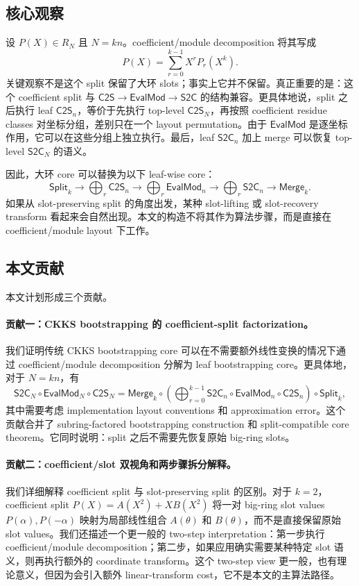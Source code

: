 \documentclass[UTF8,11pt]{article}
\newcommand{\Split}{\mathsf{Split}}
\newcommand{\Merge}{\mathsf{Merge}}
\newcommand{\CtwoS}{\mathsf{C2S}}
\newcommand{\StwoC}{\mathsf{S2C}}
\newcommand{\EvalMod}{\mathsf{EvalMod}}
\theoremstyle{definition}
\theoremstyle{plain}
\begin{document}
\subsection{核心观察}
设 $P(X)\in R_N$ 且 $N=kn$。coefficient/module decomposition 将其写成
\[
P(X)=\sum_{r=0}^{k-1}X^rP_r(X^k).
\]
关键观察不是这个 split 保留了大环 slots；事实上它并不保留。真正重要的是：这个 coefficient split 与 $\CtwoS\to\EvalMod\to\StwoC$ 的结构兼容。更具体地说，split 之后执行 leaf $\CtwoS_n$，等价于先执行 top-level $\CtwoS_N$，再按照 coefficient residue classes 对坐标分组，差别只在一个 layout permutation。由于 $\EvalMod$ 是逐坐标作用，它可以在这些分组上独立执行。最后，leaf $\StwoC_n$ 加上 merge 可以恢复 top-level $\StwoC_N$ 的语义。

因此，大环 core 可以替换为以下 leaf-wise core：
\[
\Split_k\to\bigoplus_r\CtwoS_n\to\bigoplus_r\EvalMod_n\to\bigoplus_r\StwoC_n\to\Merge_k.
\]
如果从 slot-preserving split 的角度出发，某种 slot-lifting 或 slot-recovery transform 看起来会自然出现。本文的构造不将其作为算法步骤，而是直接在 coefficient/module layout 下工作。

\subsection{本文贡献}
本文计划形成三个贡献。

\paragraph{贡献一：CKKS bootstrapping 的 coefficient-split factorization。} 我们证明传统 CKKS bootstrapping core 可以在不需要额外线性变换的情况下通过 coefficient/module decomposition 分解为 leaf bootstrapping core。更具体地，对于 $N=kn$，有
\[
\StwoC_N\circ\EvalMod_N\circ\CtwoS_N
=\Merge_k\circ\left(\bigoplus_{r=0}^{k-1}\StwoC_n\circ\EvalMod_n\circ\CtwoS_n\right)\circ\Split_k,
\]
其中需要考虑 implementation layout conventions 和 approximation error。这个贡献合并了 subring-factored bootstrapping construction 和 split-compatible core theorem。它同时说明：split 之后不需要先恢复原始 big-ring slots。

\paragraph{贡献二：coefficient/slot 双视角和两步骤拆分解释。} 我们详细解释 coefficient split 与 slot-preserving split 的区别。对于 $k=2$，coefficient split
$P(X)=A(X^2)+XB(X^2)$ 将一对 big-ring slot values $P(\alpha),P(-\alpha)$ 映射为局部线性组合 $A(\theta)$ 和 $B(\theta)$，而不是直接保留原始 slot values。我们还描述一个更一般的 two-step interpretation：第一步执行 coefficient/module decomposition；第二步，如果应用确实需要某种特定 slot 语义，则再执行额外的 coordinate transform。这个 two-step view 更一般，也有理论意义，但因为会引入额外 linear-transform cost，它不是本文的主算法路径。
\end{document}
